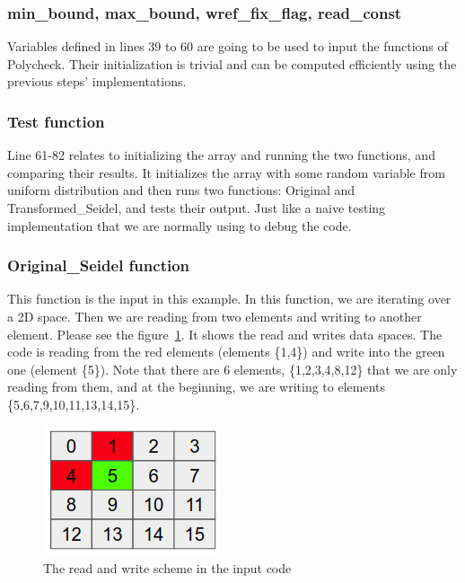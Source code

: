 \documentclass[letterpaper,12pt]{article}
\begin{document}
	\subsubsection{min\_bound, max\_bound, wref\_fix\_flag, read\_const}
	Variables defined in lines 39 to 60 are going to be used to input the functions of Polycheck. Their initialization is trivial and can be computed efficiently using the previous steps' implementations.
	
	\subsubsection{Test function}
	Line 61-82 relates to initializing the array and running the two functions, and comparing their results. It initializes the array with some random variable from uniform distribution and then runs two functions: Original and Transformed\_Seidel, and tests their output. Just like a naive testing implementation that we are normally using to debug the code.
	
	\subsubsection{Original\_Seidel function}
	This function is the input in this example. In this function, we are iterating over a 2D space. Then we are reading from two elements and writing to another element. Please see the figure~\ref{fig:readWrite}. It shows the read and writes data spaces. The code is reading from the red elements (elements \{1,4\}) and write into the green one (element \{5\}). Note that there are 6 elements, \{1,2,3,4,8,12\} that we are only reading from them, and at the beginning, we are writing to elements \{5,6,7,9,10,11,13,14,15\}.
	
	\begin{figure}[h!]
		\centering
		\includegraphics[scale=1]{fig/seidel_code.png}
		\caption{The read and write scheme in the input code}
		\label{fig:readWrite}
	\end{figure}
	
\end{document}
